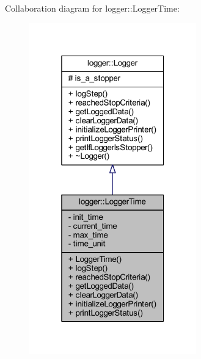 Collaboration diagram for logger\+:\+:Logger\+Time\+:
\nopagebreak
\begin{figure}[H]
\begin{center}
\leavevmode
\includegraphics[width=205pt]{classlogger_1_1_logger_time__coll__graph}
\end{center}
\end{figure}

